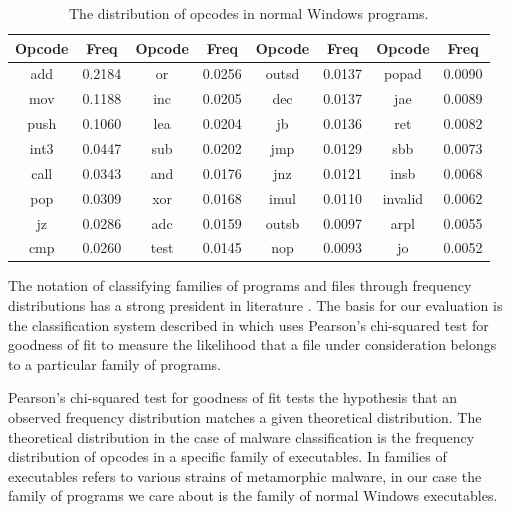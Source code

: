 \documentclass[finalcopy,short]{srpaper}
\begin{document}
        \begin{table}
            \centering
            \begin{tabular}{|c|c||c|c||c|c||c|c|}
                \hline
                Opcode & Freq & Opcode & Freq & Opcode & Freq & Opcode & Freq \\
                \hline
                add & 0.2184 & or & 0.0256 & outsd & 0.0137 & popad & 0.0090 \\
                \hline
                mov & 0.1188 & inc & 0.0205 & dec & 0.0137 & jae & 0.0089 \\
                \hline
               push & 0.1060 & lea & 0.0204 & jb & 0.0136 & ret & 0.0082 \\
                \hline
               int3 & 0.0447 & sub & 0.0202 & jmp & 0.0129 & sbb & 0.0073 \\
                \hline
               call & 0.0343 & and & 0.0176 & jnz & 0.0121 & insb & 0.0068 \\
                \hline
                pop & 0.0309 & xor & 0.0168 & imul & 0.0110 & invalid & 0.0062 \\ 
                \hline
                 jz & 0.0286 & adc & 0.0159 & outsb & 0.0097 & arpl & 0.0055 \\ 
                \hline
                cmp & 0.0260 & test & 0.0145 & nop & 0.0093 & jo & 0.0052 \\
                \hline
            \end{tabular}
            \caption{The distribution of opcodes in normal Windows programs.}
            \label{tab:results-windows-dist}
        \end{table}

        The notation of classifying families of programs and files through
        frequency distributions has a strong president in literature
        \cite{chisquared,hmm_evade,stat_model,fileprints}. The basis for our
        evaluation is the classification system described in \cite{chisquared}
        which uses Pearson's chi-squared test for goodness of fit to measure the
        likelihood that a file under consideration belongs to a particular
        family of programs.

        Pearson's chi-squared test for goodness of fit tests the hypothesis that
        an observed frequency distribution matches a given theoretical
        distribution. The theoretical distribution in the case of malware
        classification is the frequency distribution of opcodes in a specific
        family of executables. In \cite{chisquared} families of executables
        refers to various strains of metamorphic malware, in our case the family
        of programs we care about is the family of normal Windows executables.
        
\end{document}
